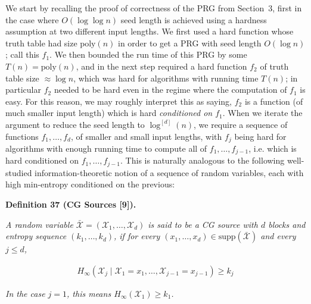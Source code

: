 We start by recalling the proof of correctness of the PRG from Section 3, first in the case where $O(\log\log n)$ seed length is achieved using a hardness assumption at two different input lengths. We first used a hard function whose truth table had size $\mathrm{poly}(n)$ in order to get a PRG with seed length $O(\log n)$; call this $f_{1}$. We then bounded the run time of this PRG by some $T(n)=\mathrm{poly}(n)$, and in the next step required a hard function $f_{2}$ of truth table size $\approx\log n$, which was hard for algorithms with running time $T(n)$; in particular $f_{2}$ needed to be hard even in the regime where the computation of $f_{1}$ is easy. For this reason, we may roughly interpret this as saying, $f_{2}$ is a function (of much smaller input length) which is hard \emph{conditioned on $f_{1}$}.
When we iterate the argument to reduce the seed length to $\log^{[d]}(n)$, we require a sequence of functions $f_{1},\ldots,f_{d}$, of smaller and small input lengths, with $f_{j}$ being hard for algorithms with enough running time to compute all of $f_{1},\ldots,f_{j-1}$, i.e. which is hard conditioned on $f_{1},\ldots,f_{j-1}$. This is naturally analogous to the following well-studied information-theoretic notion of a sequence of random variables, each with high min-entropy conditioned on the previous:\par





\par\medskip\noindent\textbf{
\textbf{Definition 37}\textbf{ }(CG Sources [9])\textbf{.}
}\par



\emph{A random variable $\bar{\mathcal{X}}=(\mathcal{X}_{1},\ldots,\mathcal{X}_{d})$ is said to be a CG source with $d$ blocks and entropy sequence $(k_{1},\ldots,k_{d})$, if for every $(x_{1},\ldots,x_{d})\in\mathrm{supp}(\bar{\mathcal{X}})$ and every $j\leq d$,}\par


\[\begin{gathered}
H_{\infty}(\mathcal{X}_{j}\mid\mathcal{X}_{1}=x_{1},\ldots,\mathcal{X}_{j-1}=x_{j-1})\geq k_{j}
\end{gathered}\]


\emph{In the case $j=1$, this means $H_{\infty}(\mathcal{X}_{1})\geq k_{1}$.}\par






